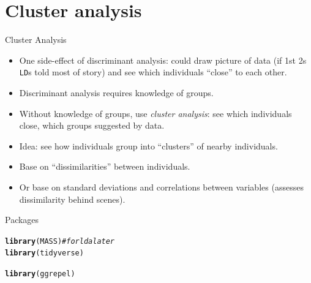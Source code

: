 \documentclass[unknownkeysallowed]{beamer}\usepackage[]{graphicx}\usepackage[]{color}
\makeatletter
\newcommand{\hlcom}[1]{\textcolor[rgb]{0.678,0.584,0.686}{\textit{#1}}}%
\newcommand{\hlstd}[1]{\textcolor[rgb]{0.345,0.345,0.345}{#1}}%
\newcommand{\hlkwd}[1]{\textcolor[rgb]{0.737,0.353,0.396}{\textbf{#1}}}%
\newenvironment{kframe}{%
 \def\at@end@of@kframe{}%
 \ifinner\ifhmode%
  \def\at@end@of@kframe{\end{minipage}}%
  \begin{minipage}{\columnwidth}%
 \fi\fi%
 \def\FrameCommand##1{\hskip\@totalleftmargin \hskip-\fboxsep
 \colorbox{shadecolor}{##1}\hskip-\fboxsep
     \hskip-\linewidth \hskip-\@totalleftmargin \hskip\columnwidth}%
 \MakeFramed {\advance\hsize-\width
   \@totalleftmargin\z@ \linewidth\hsize
   \@setminipage}}%
 {\par\unskip\endMakeFramed%
 \at@end@of@kframe}
\newenvironment{knitrout}{}{} %
\makeatother
\begin{document}
\section{Cluster analysis}
\frame{\sectionpage}


\begin{frame}[fragile]{Cluster Analysis}

  \begin{itemize}
  \item One side-effect of discriminant analysis: could draw picture of data (if 1st 2s \texttt{LD}s told most of story) and see which individuals ``close'' to each other.
  \item Discriminant analysis requires knowledge of groups.
  \item Without knowledge of groups, use {\em cluster analysis}: see which individuals close, which groups suggested by data.
  \item Idea: see how individuals group into ``clusters'' of nearby individuals.
  \item Base on ``dissimilarities'' between individuals.
  \item Or base on standard deviations and correlations between variables (assesses dissimilarity behind scenes).
  \end{itemize}

\end{frame}

\begin{frame}[fragile]{Packages}
  
\begin{knitrout}
\color{fgcolor}\begin{kframe}
\begin{alltt}
\hlkwd{library}\hlstd{(MASS)} \hlcom{# for lda later}
\hlkwd{library}\hlstd{(tidyverse)}
\end{alltt}


{\ttfamily\noindent\itshape\color{messagecolor}{\#\# -- Attaching packages ------------------- tidyverse 1.2.1 --}}

{\ttfamily\noindent\itshape\color{messagecolor}{\#\# v ggplot2 3.1.0\ \ \ \ \ \  v purrr\ \  0.3.1\ \ \\\#\# v tibble\ \ 2.0.1\ \ \ \ \ \  v dplyr\ \  0.8.0.1\\\#\# v tidyr\ \  0.8.3\ \ \ \ \ \  v stringr 1.4.0\ \ \\\#\# v readr\ \  1.3.1\ \ \ \ \ \  v forcats 0.3.0}}

{\ttfamily\noindent\itshape\color{messagecolor}{\#\# -- Conflicts ---------------------- tidyverse\_conflicts() --\\\#\# x dplyr::filter() masks stats::filter()\\\#\# x dplyr::lag()\ \ \ \ masks stats::lag()\\\#\# x dplyr::select() masks MASS::select()}}\begin{alltt}
\hlkwd{library}\hlstd{(ggrepel)}
\end{alltt}
\end{kframe}
\end{knitrout}

  
\end{frame}
\end{document}
